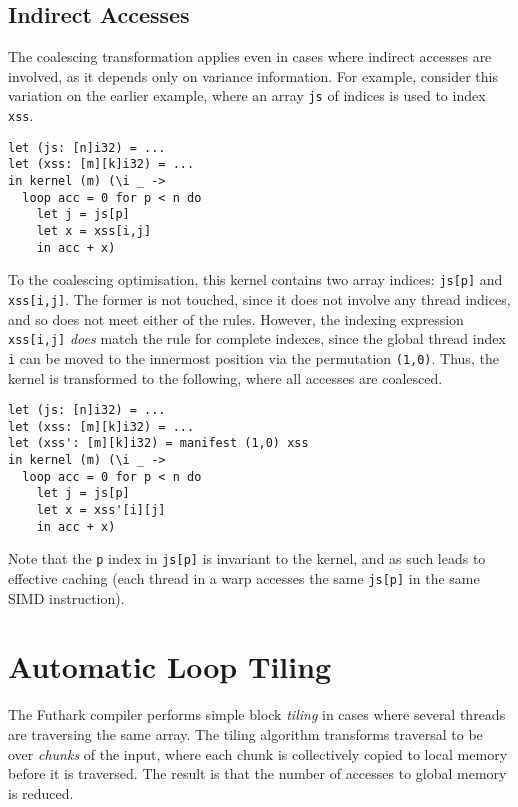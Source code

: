 \subsection{Indirect Accesses}

The coalescing transformation applies even in cases where indirect
accesses are involved, as it depends only on variance information.
For example, consider this variation on the earlier example, where an
array \texttt{js} of indices is used to index \texttt{xss}.

\begin{lstlisting}[numbers=none]
let (js: [n]i32) = ...
let (xss: [m][k]i32) = ...
in kernel (m) (\i _ ->
  loop acc = 0 for p < n do
    let j = js[p]
    let x = xss[i,j]
    in acc + x)
\end{lstlisting}

To the coalescing optimisation, this kernel contains two array
indices: \texttt{js[p]} and \texttt{xss[i,j]}.  The former is not
touched, since it does not involve any thread indices, and so does not
meet either of the rules.  However, the indexing expression
\texttt{xss[i,j]} \textit{does} match the rule for complete indexes,
since the global thread index \texttt{i} can be moved to the innermost
position via the permutation \texttt{(1,0)}.  Thus, the kernel is
transformed to the following, where all accesses are coalesced.

\begin{lstlisting}[numbers=none]
let (js: [n]i32) = ...
let (xss: [m][k]i32) = ...
let (xss': [m][k]i32) = manifest (1,0) xss
in kernel (m) (\i _ ->
  loop acc = 0 for p < n do
    let j = js[p]
    let x = xss'[i][j]
    in acc + x)
\end{lstlisting}

Note that the \texttt{p} index in \texttt{js[p]} is invariant to the
kernel, and as such leads to effective caching (each thread in a warp
accesses the same \texttt{js[p]} in the same SIMD instruction).

\section{Automatic Loop Tiling}
\label{sec:automatic-tiling}

The Futhark compiler performs simple block \textit{tiling} in cases
where several threads are traversing the same array.  The tiling
algorithm transforms traversal to be over \textit{chunks} of the
input, where each chunk is collectively copied to local memory before
it is traversed.  The result is that the number of accesses to global
memory is reduced.

